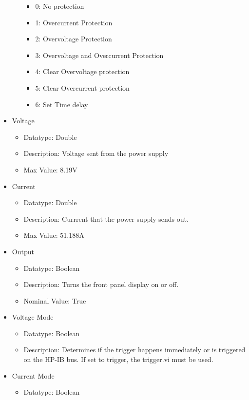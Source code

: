 \documentclass{article}
\begin{document}
\begin{itemize}
\begin{itemize}
\begin{itemize}
            \item 0: No protection
            \item 1: Overcurrent Protection
            \item 2: Overvoltage Protection
            \item 3: Overvoltage and Overcurrent Protection
            \item 4: Clear Overvoltage protection
            \item 5: Clear Overcurrent protection
            \item 6: Set Time delay
        \end{itemize}
    \end{itemize}
    \item Voltage
    \begin{itemize}
        \item Datatype: Double
        \item Description: Voltage sent from the power supply
        \item Max Value: 8.19V
    \end{itemize}
    \item Current
    \begin{itemize}
        \item Datatype: Double
        \item Description: Currrent that the power supply sends out.
        \item Max Value: 51.188A
    \end{itemize}
    \item Output
    \begin{itemize}
        \item Datatype: Boolean
        \item Description: Turns the front panel display on or off.
        \item Nominal Value: True
    \end{itemize}
    \item Voltage Mode
    \begin{itemize}
        \item Datatype: Boolean
        \item Description: Determines if the trigger happens immediately or  is triggered on the HP-IB bus. If set to trigger, the trigger.vi must be used.
    \end{itemize}
    \item Current Mode
    \begin{itemize}
        \item Datatype: Boolean

\end{itemize}
\end{itemize}
\end{document}
